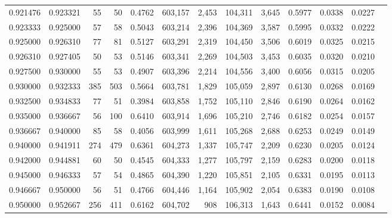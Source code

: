 \begin{tabular}{rrrrrrrrrrrrr}
0.921476 & 0.923321 &    55 &  50 &                                     0.4762 & 603,157 &   2,453 & 104,311 &   3,645 & 0.5977 & 0.0338 & 0.0227 \\
0.923333 & 0.925000 &    57 &  58 &                                     0.5043 & 603,214 &   2,396 & 104,369 &   3,587 & 0.5995 & 0.0332 & 0.0222 \\
0.925000 & 0.926310 &    77 &  81 &                                     0.5127 & 603,291 &   2,319 & 104,450 &   3,506 & 0.6019 & 0.0325 & 0.0215 \\
0.926310 & 0.927405 &    50 &  53 &                                     0.5146 & 603,341 &   2,269 & 104,503 &   3,453 & 0.6035 & 0.0320 & 0.0210 \\
0.927500 & 0.930000 &    55 &  53 &                                     0.4907 & 603,396 &   2,214 & 104,556 &   3,400 & 0.6056 & 0.0315 & 0.0205 \\
0.930000 & 0.932333 &   385 & 503 &                                     0.5664 & 603,781 &   1,829 & 105,059 &   2,897 & 0.6130 & 0.0268 & 0.0169 \\
0.932500 & 0.934833 &    77 &  51 &                                     0.3984 & 603,858 &   1,752 & 105,110 &   2,846 & 0.6190 & 0.0264 & 0.0162 \\
0.935000 & 0.936667 &    56 & 100 &                                     0.6410 & 603,914 &   1,696 & 105,210 &   2,746 & 0.6182 & 0.0254 & 0.0157 \\
0.936667 & 0.940000 &    85 &  58 &                                     0.4056 & 603,999 &   1,611 & 105,268 &   2,688 & 0.6253 & 0.0249 & 0.0149 \\
0.940000 & 0.941911 &   274 & 479 &                                     0.6361 & 604,273 &   1,337 & 105,747 &   2,209 & 0.6230 & 0.0205 & 0.0124 \\
0.942000 & 0.944881 &    60 &  50 &                                     0.4545 & 604,333 &   1,277 & 105,797 &   2,159 & 0.6283 & 0.0200 & 0.0118 \\
0.945000 & 0.946333 &    57 &  54 &                                     0.4865 & 604,390 &   1,220 & 105,851 &   2,105 & 0.6331 & 0.0195 & 0.0113 \\
0.946667 & 0.950000 &    56 &  51 &                                     0.4766 & 604,446 &   1,164 & 105,902 &   2,054 & 0.6383 & 0.0190 & 0.0108 \\
0.950000 & 0.952667 &   256 & 411 &                                     0.6162 & 604,702 &     908 & 106,313 &   1,643 & 0.6441 & 0.0152 & 0.0084 \\

\end{tabular}
